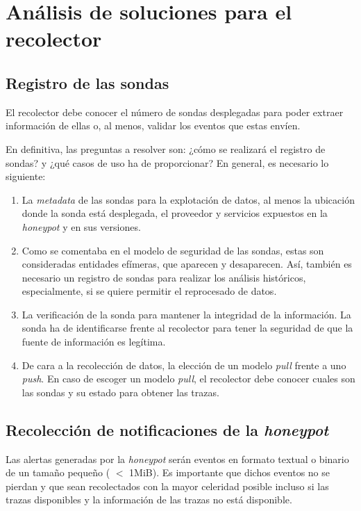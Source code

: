 \section{Análisis de soluciones para el recolector}


\subsection{Registro de las sondas}

El recolector debe conocer el número de sondas desplegadas para poder extraer información de ellas o, al menos, validar
los eventos que estas envíen.

En definitiva, las preguntas a resolver son: ¿cómo se realizará el registro de sondas? y ¿qué casos de uso ha de proporcionar? En general, es necesario lo siguiente:

\begin{enumerate}
    \item La \emph{metadata} de las sondas para la explotación de datos, al menos la ubicación donde la sonda está desplegada, el proveedor y servicios expuestos en la \emph{honeypot} y en sus versiones.
    \item Como se comentaba en el modelo de seguridad de las sondas, estas son consideradas entidades efímeras, que aparecen y desaparecen. 
    Así, también es necesario un registro de sondas para realizar los análisis históricos, especialmente, si se quiere permitir el reprocesado de datos.
    \item La verificación de la sonda para mantener la integridad de la información. La sonda ha de identificarse frente al recolector para tener la seguridad de que la fuente de información es legítima.
    \item De cara a la recolección de datos, la elección de un modelo \emph{pull} frente a uno \emph{push}. En caso de escoger un modelo \emph{pull}, el recolector debe conocer
    cuales son las sondas y su estado para obtener las trazas.
\end{enumerate}

\subsection{Recolección de notificaciones de la \emph{honeypot}}

Las alertas generadas por la \emph{honeypot} serán eventos en formato textual o binario de un tamaño pequeño ( $<$ 1MiB). 
Es importante que dichos eventos no se pierdan y que sean recolectados con la mayor celeridad posible incluso si las trazas disponibles
y la información de las trazas no está disponible.

